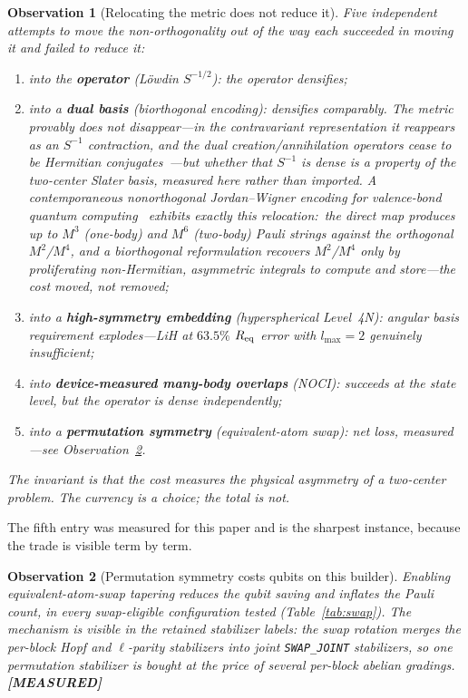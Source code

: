 \documentclass[aps,pra,twocolumn,superscriptaddress,longbibliography]{revtex4-2}
\newtheorem{observation}{Observation}
\begin{document}
\begin{observation}[Relocating the metric does not reduce it]
\label{obs:cost_conservation}
Five independent attempts to move the non-orthogonality out of the way
each succeeded in moving it and failed to reduce it:
\begin{enumerate}
\item into the \textbf{operator} (L\"owdin $S^{-1/2}$): the operator
densifies;
\item into a \textbf{dual basis} (biorthogonal encoding): densifies
comparably.  The metric provably does not disappear---in the contravariant
representation it reappears as an $S^{-1}$ contraction, and the dual
creation/annihilation operators cease to be Hermitian
conjugates~\cite{artacho1991}---but whether that $S^{-1}$ is
\emph{dense} is a property of the two-center Slater basis, measured here
rather than imported.  A contemporaneous nonorthogonal Jordan--Wigner
encoding for valence-bond quantum computing~\cite{marruzzo2025} exhibits
exactly this relocation:\ the direct map produces up to $M^{3}$ (one-body)
and $M^{6}$ (two-body) Pauli strings against the orthogonal
$M^{2}$/$M^{4}$, and a biorthogonal reformulation recovers $M^{2}$/$M^{4}$
only by proliferating non-Hermitian, asymmetric integrals to compute and
store---the cost moved, not removed;
\item into a \textbf{high-symmetry embedding} (hyperspherical Level~4N):
angular basis requirement explodes---LiH at $63.5\%$ $R_{\rm eq}$ error
with $l_{\max} = 2$ genuinely insufficient;
\item into \textbf{device-measured many-body overlaps} (NOCI): succeeds
at the state level, but the operator is dense independently;
\item into a \textbf{permutation symmetry} (equivalent-atom swap): net
loss, measured---see Observation~\ref{obs:permutation_cost}.
\end{enumerate}
The invariant is that the cost measures the physical asymmetry of a
two-center problem.  The currency is a choice; the total is not.
\end{observation}

The fifth entry was measured for this paper and is the sharpest instance,
because the trade is visible term by term.

\begin{observation}[Permutation symmetry costs qubits on this builder]
\label{obs:permutation_cost}
Enabling equivalent-atom-swap tapering \emph{reduces} the qubit saving and
inflates the Pauli count, in every swap-eligible configuration tested
(Table~\ref{tab:swap}).  The mechanism is visible in the retained
stabilizer labels: the swap rotation merges the per-block Hopf and
$\ell$-parity stabilizers into joint \texttt{SWAP\_JOINT} stabilizers, so
one permutation stabilizer is bought at the price of several per-block
abelian gradings.  \textbf{[MEASURED]}
\end{observation}
\end{document}
